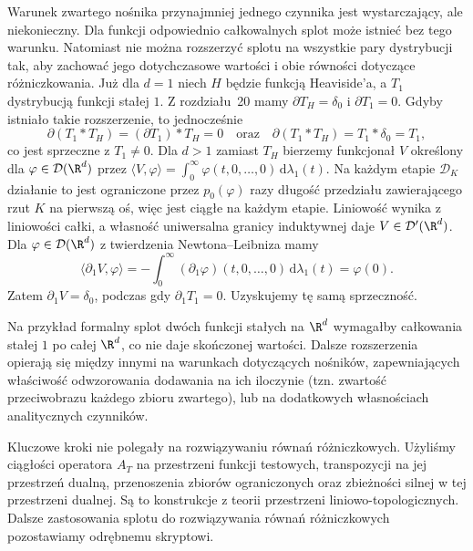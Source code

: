 \begin{uwaga}
\label{rem:convolution-limits21}
Warunek zwartego nośnika przynajmniej jednego
czynnika jest wystarczający, ale niekonieczny.
Dla funkcji odpowiednio całkowalnych splot może istnieć
bez tego warunku. Natomiast nie można rozszerzyć splotu na wszystkie pary
dystrybucji tak, aby zachować jego dotychczasowe wartości
i obie równości dotyczące różniczkowania.
Już dla $d=1$ niech $H$ będzie funkcją Heaviside'a,
a $T_1$ dystrybucją funkcji stałej $1$.
Z rozdziału~20 mamy $\partial T_H=\delta_0$ i
$\partial T_1=0$. Gdyby istniało takie rozszerzenie,
to jednocześnie
\[
 \partial(T_1*T_H)=(\partial T_1)*T_H=0
 \quad\text{oraz}\quad
 \partial(T_1*T_H)=T_1*\delta_0=T_1,
\]
co jest sprzeczne z $T_1\ne0$.
Dla $d>1$ zamiast $T_H$ bierzemy funkcjonał $V$
określony dla $\varphi\in\mathcal D(\R^d)$ przez
$\langle V,\varphi\rangle=\int_0^\infty
\varphi(t,0,\ldots,0)\,\mathrm d\lambda_1(t)$.
Na każdym etapie $\mathcal D_K$ działanie to jest
ograniczone przez $p_0(\varphi)$ razy długość
przedziału zawierającego rzut $K$ na pierwszą oś,
więc jest ciągłe na każdym etapie. Liniowość wynika z
liniowości całki, a własność uniwersalna granicy induktywnej
daje $V\in\mathcal D'(\R^d)$. Dla $\varphi\in\mathcal D(\R^d)$
z twierdzenia Newtona--Leibniza mamy
\[
 \langle\partial_1V,\varphi\rangle
 =-\int_0^\infty(\partial_1\varphi)(t,0,\ldots,0)
 \,\mathrm d\lambda_1(t)=\varphi(0).
\]
Zatem $\partial_1 V=\delta_0$, podczas gdy
$\partial_1 T_1=0$. Uzyskujemy tę samą sprzeczność.

Na przykład formalny splot dwóch funkcji stałych
na $\R^d$ wymagałby całkowania stałej $1$
po całej $\R^d$, co nie daje skończonej wartości.
Dalsze rozszerzenia opierają się między innymi
na warunkach dotyczących nośników, zapewniających
właściwość odwzorowania dodawania na ich iloczynie
(tzn. zwartość przeciwobrazu każdego zbioru zwartego),
lub na dodatkowych własnościach analitycznych czynników.
\end{uwaga}

\begin{uwaga}
\label{rem:convolution-tvs21}
Kluczowe kroki nie polegały na rozwiązywaniu równań
różniczkowych. Użyliśmy ciągłości operatora
$A_T$ na przestrzeni funkcji testowych, transpozycji
na jej przestrzeń dualną, przenoszenia zbiorów ograniczonych
oraz zbieżności silnej w tej przestrzeni dualnej.
Są to konstrukcje z teorii przestrzeni liniowo-topologicznych.
Dalsze zastosowania splotu do rozwiązywania równań
różniczkowych pozostawiamy odrębnemu skryptowi.
\end{uwaga}
